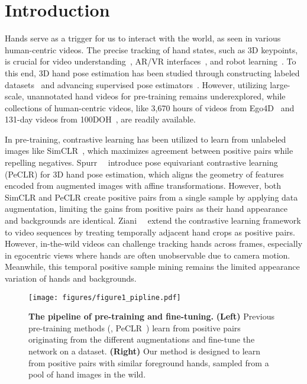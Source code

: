 \section{Introduction}
Hands serve as a trigger for us to interact with the world, as seen in various human-centric videos. 
The precise tracking of hand states, such as 3D keypoints, is crucial for video understanding~\citep{sener:cvpr22,wen:arxiv23}, AR/VR interfaces~\citep{han:tog22,wu:vcir20}, and robot learning~\citep{chao:cvpr21,qin:eccv22}. To this end, 3D hand pose estimation has been studied through constructing labeled datasets~\citep{ohkawa:ijcv23,zimmermann:iccv19,chao:cvpr21,ohkawa:cvpr23} and advancing supervised pose estimators~\citep{cai:eccv18,ge:cvpr19,park:cvpr22,liu:cvpr24,fan:eccv24}. 
However, utilizing large-scale, unannotated hand videos for pre-training remains underexplored, while collections of human-centric videos, like 3,670 hours of videos from Ego4D~\citep{grauman:cvpr22} and 131-day videos from 100DOH~\citep{shan:cvpr20}, are readily available.

In pre-training, contrastive learning has been utilized to learn from unlabeled images like SimCLR~\citep{chen:icml20}, which maximizes agreement between positive pairs while repelling negatives. 
Spurr~\etal~\citep{spurr:iccv21} introduce pose equivariant contrastive learning (PeCLR) for 3D hand pose estimation, which aligns the geometry of features encoded from augmented images with affine transformations.
However, both SimCLR and PeCLR create positive pairs from a single sample by applying data augmentation, limiting the gains from positive pairs as their hand appearance and backgrounds are identical. Ziani~\etal~\citep{ziani:3dv22} extend the contrastive learning framework to video sequences by treating temporally adjacent hand crops as positive pairs. 
However, in-the-wild videos can challenge tracking hands across frames, especially in egocentric views where hands are often unobservable due to camera motion. 
Meanwhile, this temporal positive sample mining remains the limited appearance variation of hands and backgrounds.

\begin{figure}[t!]
\vspace{-2mm}
    \begin{center}
    \texttt{[image: figures/figure1\_pipline.pdf]}
    \end{center}
    \vspace{-3mm}
    \caption{
    \textbf{The pipeline of pre-training and fine-tuning.} \textbf{(Left)} Previous pre-training methods (\eg, PeCLR~\citep{spurr:iccv21}) learn from positive pairs originating from the different augmentations and fine-tune the network on a dataset.
    \textbf{(Right)} Our method is designed to learn from positive pairs with similar foreground hands, sampled from a pool of hand images in the wild. 
   }
    \label{fig:pipline}
    \vspace{-6mm}
\end{figure}

